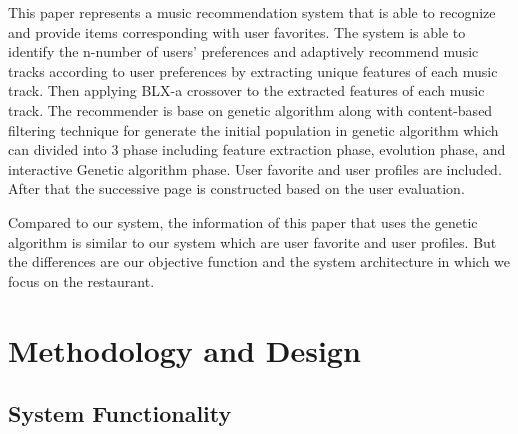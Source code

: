 \documentclass[12pt,oneside,openright,a4paper]{cpe-english-project}
\begin{document}
This paper represents a music recommendation system that is able to recognize and provide items corresponding with user favorites. The system is able to identify the n-number of users' preferences and adaptively recommend music tracks according to user preferences by extracting unique features of each music track. Then applying BLX-a crossover to the extracted features of each music track. \cite{MusicRecommender} The recommender is base on genetic algorithm along with content-based filtering technique for generate the initial population in genetic algorithm which can divided into 3 phase including feature extraction phase, evolution phase, and interactive Genetic algorithm phase. User favorite and user profiles are included. After that the successive page is constructed based on the user evaluation.

Compared to our system, the information of this paper that uses the genetic algorithm is similar to our system which are user favorite and user profiles. But the differences are our objective function and the system architecture in which we focus on the restaurant.




\chapter{Methodology and Design}

\section{System Functionality}
\end{document}
